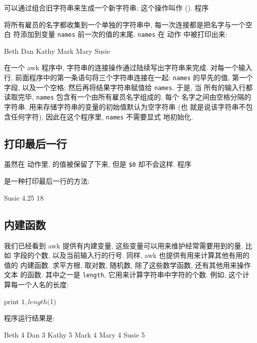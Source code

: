 可以通过组合旧字符串来生成一个新字符串; 这个操作叫作
(). 程序
将所有雇员的名字都收集到一个单独的字符串中, 每一次连接都是把名字与一个空白
符添加到变量 \texttt{names} 前一次的值的末尾. \texttt{names} 在 \END 动作
中被打印出来:
\begin{file}
    Beth Dan Kathy Mark Mary Susie 
\end{file}
在一个 awk 程序中, 字符串的连接操作通过陆续写出字符串来完成. 对每一个输入行,
前面程序中的第一条语句将三个字符串连接在一起: \texttt{names} 的早先的值,
第一个字段, 以及一个空格; 然后再将结果字符串赋值给 \texttt{names}. 于是, 当
所有的输入行都读取完毕, \texttt{names} 包含有一个由所有雇员名字组成的, 每个
名字之间由空格分隔的字符串. 用来存储字符串的变量的初始值默认为空字符串 (也
就是说该字符串不包含任何字符), 因此在这个程序里, \texttt{names} 不需要显式
地初始化.

\subsection{打印最后一行}
\label{subsec:printing_the_last_input_line}

虽然在 \END 动作里, \nr 的值被保留了下来, 但是 \verb'$0' 却不会这样. 程序
是一种打印最后一行的方法:
\begin{file}
    Susie   4.25    18
\end{file}

\subsection{内建函数}
\label{subsec:built_in_functions}

我们已经看到 awk 提供有内建变量, 这些变量可以用来维护经常需要用到的量, 比如
字段的个数, 以及当前输入行的行号. 同样, awk 也提供有用来计算其他有用的值的
内建函数. 求平方根, 取对数, 随机数, 除了这些数学函数, 还有其他用来操作文本
的函数. 其中之一是 \texttt{length}, 它用来计算字符串中字符的个数. 例如,
这个计算每一个人名的长度:
\begin{awkcode}
    { print $1, length($1) }
\end{awkcode}
程序运行结果是:
\begin{file}
    Beth 4
    Dan 3
    Kathy 5
    Mark 4
    Mary 4
    Susie 5
\end{file}

